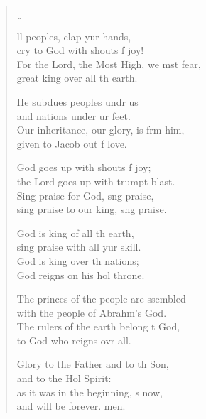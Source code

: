 \settowidth{\versewidth}{For the Lord, the Most High, we must fear, *}
\begin{verse}[\versewidth]
  \begin{patverse}
    ll peoples, clap yur hands,\Med\\
cry to God with shouts f joy!\\
For the Lord, the Most High, we mst fear,\Med\\
great king over all th earth.

He subdues peoples undr us\Med\\
and nations under ur feet.\\
Our inheritance, our glory, is frm him,\Med\\
given to Jacob out f love.

God goes up with shouts f joy;\Med\\
the Lord goes up with trumpt blast.\\
Sing praise for God, s\pointup{\i}ng praise,\Med\\
sing praise to our king, s\pointup{\i}ng praise.

God is king of all th earth,\Med\\
sing praise with all yur skill.\\
God is king over th nations;\Med\\
God reigns on his hol throne.

The princes of the people are ssembled\Med\\
with the people of Abrahm’s God.\\
The rulers of the earth belong t God,\Med\\
to God who reigns ovr all.

Glory to the Father and to th Son,\Med\\
and to the Hol Spirit:\\
as it was in the beginning, \pointup{\i}s now,\Med\\
and will be forever. men. 
  \end{patverse}
\end{verse}
